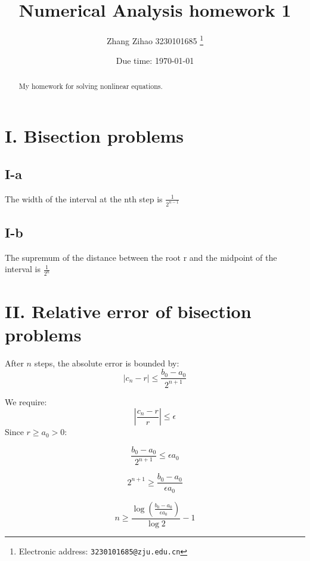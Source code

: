 \documentclass[a4paper]{article}
\begin{document}
\title{Numerical Analysis homework 1 }

\author{Zhang Zihao 3230101685
  \thanks{Electronic address: \texttt{3230101685@zju.edu.cn}}}


\date{Due time: \today}

\maketitle

\begin{abstract}
    My homework for solving nonlinear equations.     
\end{abstract}





\section*{I. Bisection problems}

\subsection*{I-a}

The width of the interval at the nth step is $\frac{1}{2^{n-1}}$\cite{Zhang2020BooleanAO}

\subsection*{I-b}

The supremum of the distance between the root r and the midpoint of the interval is $\frac{1}{2^{n}}$

\section*{II. Relative error of bisection problems}

After $n$ steps, the absolute error is bounded by:
\[
|c_n - r| \leq \frac{b_0 - a_0}{2^{n+1}}
\]

We require:
\[
\left|\frac{c_n - r}{r}\right| \leq \epsilon
\]
Since $r \geq a_0 > 0$:

\[
\frac{b_0 - a_0}{2^{n+1}} \leq \epsilon a_0
\]

\[
2^{n+1} \geq \frac{b_0 - a_0}{\epsilon a_0}
\]

\[
n \geq \frac{\log \left( \frac{b_0 - a_0}{\epsilon a_0} \right)}{\log 2} - 1
\]
\end{document}
